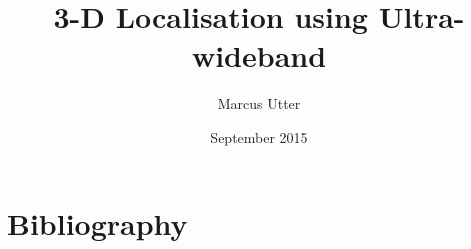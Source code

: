 \documentclass{article}
\title{3-D Localisation using Ultra-wideband}
\author{Marcus Utter }
\date{September 2015}
\begin{document}
\maketitle
\clearpage

\tableofcontents
\clearpage
















\section{Bibliography}


\end{document}
